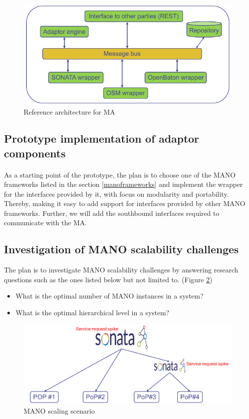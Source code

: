 \begin{figure}[h]
	\centering
	\includegraphics[width=0.9\linewidth]{figures/wp3Arch}
	\caption{Reference architecture for MA \cite{WPDescriptionsPDF}}
	\label{fig:wp3arch}
\end{figure}

\subsection{Prototype implementation of adaptor components}
\paragraph{}
As a starting point of the prototype, the plan is to choose one of the MANO frameworks listed in the section \ref{manoframeworks} and implement the wrapper for the interfaces provided by it, with focus on modularity and portability. Thereby, making it easy to add support for interfaces provided by other MANO frameworks. Further, we will add the southbound interfaces required to communicate with the MA.

\subsection{Investigation of MANO scalability challenges}
\label{wp3manoresearch}
The plan is to investigate MANO scalability challenges by answering research questions such as the ones listed below but not limited to. (Figure \ref{fig:wp3manoscale})
\begin{itemize}
	\item What is the optimal number of MANO instances in a system?
	\item What is the optimal hierarchical level in a system?
\end{itemize}

\begin{figure}[h]
	\centering
	\includegraphics[width=0.9\linewidth]{figures/wp3manoScale}
	\caption{MANO scaling scenario \cite{WPDescriptionsPDF}}
	\label{fig:wp3manoscale}
\end{figure}


